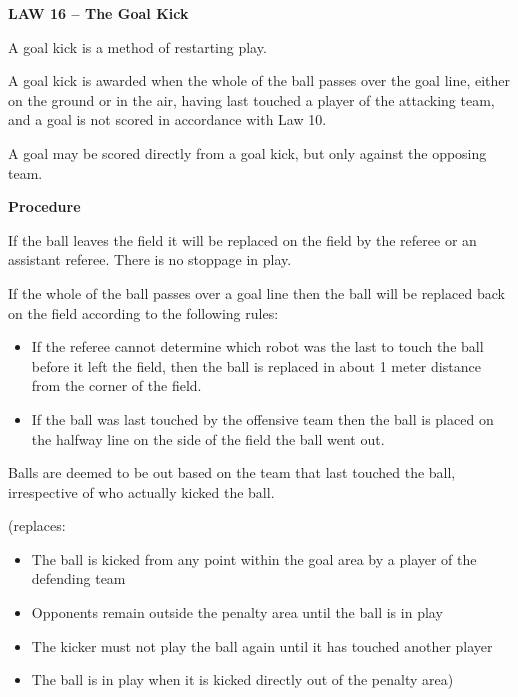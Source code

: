 \clearpage
\sffamily
{\bfseries
\textcolor[rgb]{0.4,0.4,0.4}{LAW 16 -- The Goal Kick} }


\bigskip

A goal kick is a method of restarting play.

\bigskip

A goal kick is awarded when the whole of the ball passes over the goal
line, either on the ground or in the air, having last touched a player
of the attacking team, and a goal is not scored in accordance with Law
10.

\bigskip

A goal may be scored directly from a goal kick, but only against the
opposing team.

\bigskip

{\bfseries Procedure}

\headlinebox

If the ball leaves the field it will be replaced on the field by the
referee or an assistant referee. There is no stoppage in play. 

If the whole of the ball passes over a goal line then the ball will be
replaced back on the field according to the following rules: 

\begin{itemize}
\item If the referee cannot determine which robot was the last to touch
the ball before it left the field, then the ball is replaced in about 1
meter distance from the corner of the field. 
\item If the ball was last touched by the offensive team then the ball
is placed on the halfway line on the side of the field the ball went
out. 
\end{itemize}

Balls are deemed to be out based on the team that last touched the ball,
irrespective of who actually kicked the ball. 

{\color[rgb]{0.4,0.4,0.4}
(replaces:

\begin{itemize}
\item The ball is kicked from any point within the goal area by a player of
the defending team
\item Opponents remain outside the penalty area until the ball is in play
\item The kicker must not play the ball again until it has touched another
player
\item The ball is in play when it is kicked directly out of the penalty area)
\end{itemize}
}

